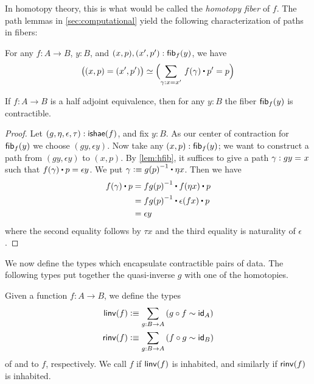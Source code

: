 In homotopy theory, this is what would be called the \emph{homotopy fiber} of $f$.
The path lemmas in \cref{sec:computational} yield the following characterization of paths in fibers:

\begin{lem}\label{lem:hfib}
  For any $f : A \to B$, $y : B$, and $(x,p),(x',p') : {\mathsf{fib}}_{f}(y)$, we have
  \[ \big((x,p) = (x',p')\big) \eqvsym \Parens{\sm{\gamma : x = x'} f(\gamma) \ct p' = p} \qedhere\]
\end{lem}

\begin{thm}\label{thm:contr-hae}
  If $f:A\to B$ is a half adjoint equivalence, then for any $y:B$ the fiber ${\mathsf{fib}}_{f}(y)$ is contractible.
\end{thm}
\begin{proof}
  Let $(g,\eta,\epsilon,\tau) : \mathsf{ishae}(f)$, and fix $y : B$.
  As our center of contraction for ${\mathsf{fib}}_{f}(y)$ we choose $(gy, \epsilon y)$.
  Now take any $(x,p) : {\mathsf{fib}}_{f}(y)$; we want to construct a path from $(gy, \epsilon y)$ to $(x,p)$.
  By \cref{lem:hfib}, it suffices to give a path $\gamma : gy =_{} x$ such that $\ap f\gamma \ct p = \epsilon y$.
  We put $\gamma \defeq \opp{g(p)} \ct \eta x$.
  Then we have
  \begin{align*}
    f(\gamma) \ct p & = \opp{fg(p)} \ct f (\eta x) \ct p \\
    & = \opp{fg(p)} \ct \epsilon(fx) \ct p \\
    & = \epsilon y
  \end{align*}
  where the second equality follows by $\tau x$ and the third equality is naturality of $\epsilon$.
\end{proof}

We now define the types which encapsulate contractible pairs of data.
The following types put together the quasi-inverse $g$ with one of the homotopies.

\begin{defn}\label{defn:linv-rinv}
  Given a function $f:A\to B$, we define the types
    \begin{align*}
      \linv(f) &\defeq \sm{g:B\to A} (g\circ f\htpy \idfunc[A])\\
      \rinv(f) &\defeq \sm{g:B\to A} (f\circ g\htpy \idfunc[B])
    \end{align*}
  of 
  and 
  to $f$, respectively.
  We call $f$ 
  if $\mathsf{linv}(f)$ is inhabited, and similarly 
  if $\mathsf{rinv}(f)$ is inhabited.
\end{defn}

